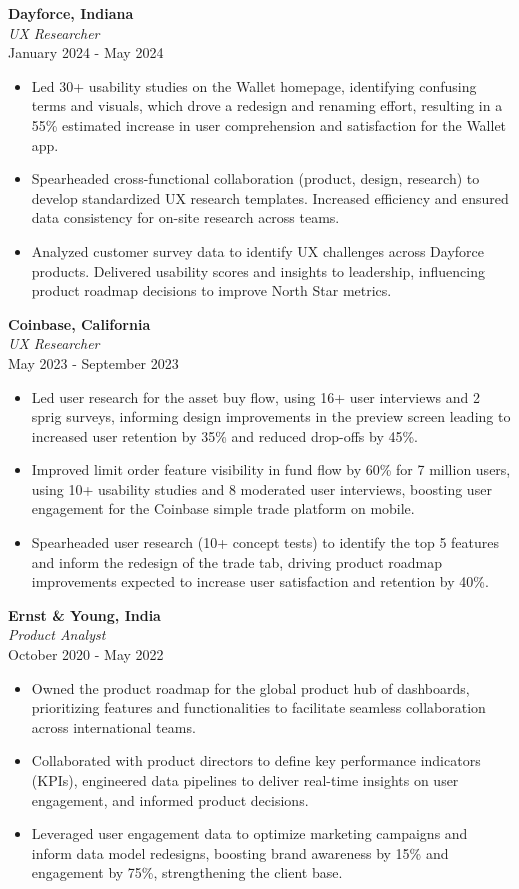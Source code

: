 \documentclass[a4paper,10pt]{article}
\begin{document}
\textbf{Dayforce, Indiana} \\
\textit{UX Researcher} \\
January 2024 - May 2024
\begin{itemize}[left=0.15cm]
    \item Led 30+ usability studies on the Wallet homepage, identifying confusing terms and visuals, which drove a redesign and renaming effort, resulting in a 55\% estimated increase in user comprehension and satisfaction for the Wallet app.
    \item Spearheaded cross-functional collaboration (product, design, research) to develop standardized UX research templates. Increased efficiency and ensured data consistency for on-site research across teams.
    \item Analyzed customer survey data to identify UX challenges across Dayforce products. Delivered usability scores and insights to leadership, influencing product roadmap decisions to improve North Star metrics.
\end{itemize}

\textbf{Coinbase, California} \\
\textit{UX Researcher} \\
May 2023 - September 2023
\begin{itemize}[left=0.15cm]
    \item Led user research for the asset buy flow, using 16+ user interviews and 2 sprig surveys, informing design improvements in the preview screen leading to increased user retention by 35\% and reduced drop-offs by 45\%.
    \item Improved limit order feature visibility in fund flow by 60\% for 7 million users, using 10+ usability studies and 8 moderated user interviews, boosting user engagement for the Coinbase simple trade platform on mobile.
    \item Spearheaded user research (10+ concept tests) to identify the top 5 features and inform the redesign of the trade tab, driving product roadmap improvements expected to increase user satisfaction and retention by 40\%.
\end{itemize}

\textbf{Ernst \& Young, India} \\
\textit{Product Analyst} \\
October 2020 - May 2022
\begin{itemize}[left=0.15cm]
    \item Owned the product roadmap for the global product hub of dashboards, prioritizing features and functionalities to facilitate seamless collaboration across international teams.
    \item Collaborated with product directors to define key performance indicators (KPIs), engineered data pipelines to deliver real-time insights on user engagement, and informed product decisions.
    \item Leveraged user engagement data to optimize marketing campaigns and inform data model redesigns, boosting brand awareness by 15\% and engagement by 75\%, strengthening the client base.
\end{itemize}
\end{document}
